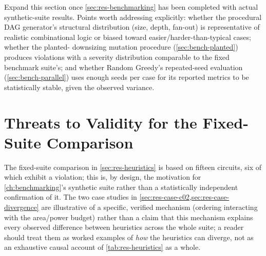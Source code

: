 \begin{authornote}
Expand this section once \cref{sec:res-benchmarking} has been completed
with actual synthetic-suite results. Points worth addressing explicitly:
whether the procedural DAG generator's structural distribution (size,
depth, fan-out) is representative of realistic combinational logic or
biased toward easier/harder-than-typical cases; whether the planted-
downsizing mutation procedure (\cref{sec:bench-planted}) produces
violations with a severity distribution comparable to the fixed benchmark
suite's; and whether Random Greedy's repeated-seed evaluation
(\cref{sec:bench-parallel}) uses enough seeds per case for its reported
metrics to be statistically stable, given the observed variance.
\end{authornote}

\section{Threats to Validity for the Fixed-Suite Comparison}
\label{sec:disc-fixed-threats}

The fixed-suite comparison in \cref{sec:res-heuristics} is based on fifteen
circuits, six of which exhibit a violation; this is, by design, the
motivation for \cref{ch:benchmarking}'s synthetic suite rather than a
statistically independent confirmation of it. The two case studies in
\cref{sec:res-case-c02,sec:res-case-divergence} are illustrative of a
specific, verified mechanism (ordering interacting with the area/power
budget) rather than a claim that this mechanism explains every observed
difference between heuristics across the whole suite; a reader should treat
them as worked examples of \emph{how} the heuristics can diverge, not as an
exhaustive causal account of \cref{tab:res-heuristics} as a whole.
